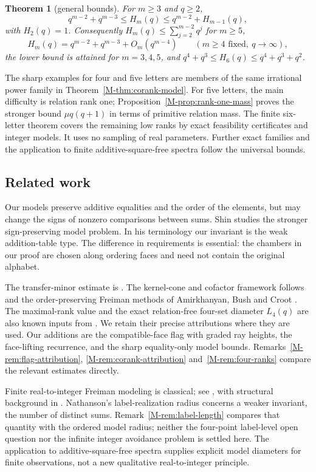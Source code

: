 \documentclass[11pt,reqno]{amsart}
\theoremstyle{plain}
\theoremstyle{definition}
\theoremstyle{plain}
\newtheorem{mainthm}{Theorem}
\theoremstyle{plain}
\theoremstyle{plain}
\theoremstyle{plain}
\theoremstyle{plain}
\theoremstyle{plain}
\theoremstyle{definition}
\theoremstyle{definition}
\theoremstyle{definition}
\theoremstyle{plain}
\begin{document}
\begin{mainthm}[general bounds]\label{M-thmF}
For $m\ge3$ and $q\ge2$,
\[
 q^{m-2}+q^{m-3}\le H_m(q)\le q^{m-2}+H_{m-1}(q),
\]
with $H_2(q)=1$. Consequently $H_m(q)\le\sum_{j=2}^{m-2}q^j$ for $m\ge5$,
\[
 H_m(q)=q^{m-2}+q^{m-3}+O_m(q^{m-4})\qquad(m\ge4\text{ fixed},\ q\to\infty),
\]
the lower bound is attained for $m=3,4,5$, and
$q^4+q^3\le H_6(q)\le q^4+q^3+q^2$.
\end{mainthm}

The sharp examples for four and five letters are members of the
same irrational power family in Theorem~\ref{M-thm:corank-model}.
For five letters, the main difficulty is relation rank one;
Proposition~\ref{M-prop:rank-one-mass} proves the stronger bound
$\mu q(q+1)$ in terms of primitive relation mass.
The finite six-letter theorem covers the remaining low ranks by exact
feasibility certificates and integer models. It uses no sampling of real
parameters. Further exact families and the application to finite
additive-square-free spectra follow the universal bounds.

\subsection{Related work}\label{M-sec:intro-shin}\label{M-sec:intro-attribution}\label{M-sec:intro-label}
Our models preserve additive equalities and the order of the elements, but may
change the signs of nonzero comparisons between sums. Shin \cite{M-Shin26} studies the
stronger sign-preserving model problem. In his terminology our invariant is
the weak addition-table type. The difference in requirements is essential:
the chambers in our proof are chosen along ordering faces and need not contain
the original alphabet.

The transfer-minor estimate is \cite[Lemma~7.1]{M-Shin26}. The kernel-cone and cofactor
framework follows \cite[Theorem~7.2]{M-Shin26} and the order-preserving Freiman methods
of Amirkhanyan, Bush and Croot \cite{M-ABC18}. The maximal-rank value and the exact
relation-free four-set diameter $L_4(q)$ are also known inputs from \cite{M-Shin26}.
We retain their precise attributions where they are used. Our additions are
the compatible-face flag with graded ray heights, the face-lifting recurrence,
and the sharp equality-only model bounds. Remarks~\ref{M-rem:flag-attribution}, \ref{M-rem:corank-attribution} and~\ref{M-rem:four-ranks} compare
the relevant estimates directly.

Finite real-to-integer Freiman modeling is classical; see \cite{M-GR09,M-Nat18,M-OBr25}, with
structural background in \cite{M-Fre73,M-Gry13,M-KL00}. Nathanson's label-realization radius \cite{M-Nat26}
concerns a weaker invariant, the number of distinct sums. Remark~\ref{M-rem:label-length} compares
that quantity with the ordered model radius; neither the four-point
label-level open question nor the infinite integer avoidance problem is
settled here. The application to additive-square-free spectra supplies
explicit model diameters for finite observations, not a new qualitative
real-to-integer principle.
\end{document}
